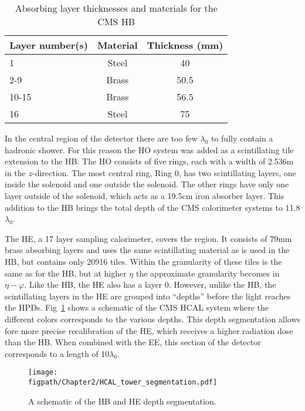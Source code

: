 \begin{table}[htbp]
\caption{Absorbing layer thicknesses and materials for the CMS HB}
\centering
\begin{tabular}{|l|c|c|}%
\hline %
Layer number(s) & Material & Thickness (\unit{mm}) \\%
\hline
1 & Steel & 40 \\%
2-9 & Brass & 50.5 \\%
10-15 & Brass & 56.5 \\%
16 & Steel & 75 \\%
\hline
\end{tabular}
\label{tab:HCAL_brass_thickness}
\end{table}

In the central region of the detector there are too few $\lambda_{0}$ to fully contain a hadronic shower.
For this reason the HO system was added as a scintillating tile extension to the HB.
The HO consists of five rings, each with a width of 2.536\unit{m} in the $z$-direction.
The most central ring, Ring 0, has two scintillating layers, one inside the solenoid and one outside the solenoid.
The other rings have only one layer outside of the solenoid, which acts as a 19.5\unit{cm} iron absorber layer.
This addition to the HB brings the total depth of the CMS calorimeter systems to 11.8$\lambda_{0}$.

The HE, a 17 layer sampling calorimeter, covers the  region.
It consists of 79\unit{mm} brass absorbing layers and uses the same scintillating material as is used in the HB, but contains only 20916 tiles.
Within  the granularity of these tiles is the same as for the HB, but at higher $\eta$ the approximate granularity becomes  in $\eta-\varphi$.
Like the HB, the HE also has a layer 0.
However, unlike the HB, the scintillating layers in the HE are grouped into ``depths'' before the light reaches the HPDs.
Fig~\ref{fig:CMS_HCAL_depth} shows a schematic of the CMS HCAL system where the different colors corresponds to the various depths.
This depth segmentation allows fore more precise recalibration of the HE, which receives a higher radiation dose than the HB.
When combined with the EE, this section of the detector corresponds to a length of 10$\lambda_{0}$.

\begin{figure}[!hbt]
	\centering
	\texttt{[image: \\figpath/Chapter2/HCAL\_tower\_segmentation.pdf]}
	\caption{A schematic of the HB and HE depth segmentation.}
	\label{fig:CMS_HCAL_depth}
\end{figure}

